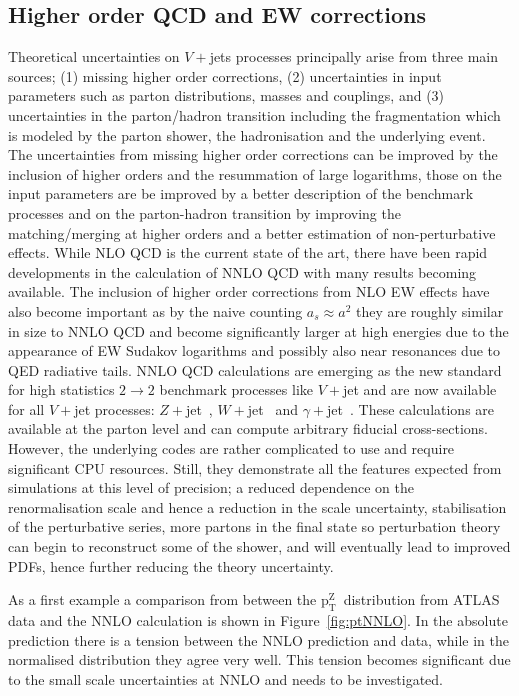 \documentclass[a4paper,11pt,notoc]{article}
\newcommand{\ptZ}{\ensuremath{\mathrm{p_T^{Z}}}}
\begin{document}
\subsection{Higher order QCD and EW corrections}
Theoretical uncertainties on $V+$jets processes principally arise from three
main sources; (1) missing higher order corrections, (2) uncertainties in input
parameters such as parton distributions, masses and couplings, and (3)
uncertainties in the parton/hadron transition including the fragmentation which
is modeled by the parton shower, the hadronisation and the underlying event. The
uncertainties from missing higher order corrections can be improved by the
inclusion of higher orders and the resummation of large logarithms, those on the
input parameters are be improved by a better description of the benchmark
processes and on the parton-hadron transition by improving the matching/merging
at higher orders and a better estimation of non-perturbative effects. While NLO
QCD is the current state of the art, there have been rapid developments in the
calculation of NNLO QCD with many results becoming available. The inclusion of
higher order corrections from NLO EW effects have also become important as by
the naive counting $a_s \approx a^2$ they are roughly similar in size to
NNLO QCD and become significantly larger at high energies due to the appearance
of EW Sudakov logarithms and possibly also near resonances due to QED radiative
tails. NNLO QCD calculations are emerging as the new standard for high statistics
$2\to2$ benchmark processes like $V+$jet and are now available for all $V+$jet processes:
$Z+$jet~\cite{Ridder:2015dxa,Ridder:2016nkl,Gehrmann-DeRidder:2016jns,Boughezal:2015ded,Boughezal:2016isb},
$W+$jet~\cite{Boughezal:2015dva,Boughezal:2016dtm} and
$\gamma+$jet~\cite{Campbell:2016lzl,Campbell:2017dqk}.
%
These calculations are available at the parton level and can compute arbitrary fiducial
cross-sections. However, the underlying codes are rather complicated to use and require significant CPU
resources. Still, they demonstrate all the features expected from simulations at this level 
of precision; a reduced dependence on the renormalisation scale and hence a
reduction in the scale uncertainty, stabilisation of the perturbative series,
more partons in the final state so perturbation theory can begin to reconstruct
some of the shower, and will eventually lead to improved PDFs, hence further
reducing the theory uncertainty. 

As a first example a comparison from \cite{Ridder:2016nkl}
between the \ptZ\ distribution from ATLAS data and the NNLO calculation is shown in Figure~\ref{fig:ptNNLO}.
In the absolute prediction there is a tension between the NNLO prediction and data, while in the normalised distribution they agree very well. This tension becomes significant due to the small  scale uncertainties
at NNLO and needs to be investigated.
\end{document}
